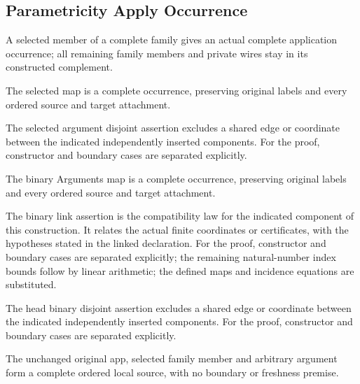 \subsection{Parametricity Apply Occurrence}
A selected member of a complete family gives an actual complete application occurrence; all remaining family members and private wires stay in its constructed complement.

The selected map is a complete occurrence, preserving original labels and every ordered source and target attachment.
\par{}

The selected argument disjoint assertion excludes a shared edge or coordinate between the indicated independently inserted components.
For the proof, constructor and boundary cases are separated explicitly.
\par{}

The binary Arguments map is a complete occurrence, preserving original labels and every ordered source and target attachment.
\par{}

The binary link assertion is the compatibility law for the indicated component of this construction. It relates the actual finite coordinates or certificates, with the hypotheses stated in the linked declaration.
For the proof, constructor and boundary cases are separated explicitly; the remaining natural-number index bounds follow by linear arithmetic; the defined maps and incidence equations are substituted.
\par{}

The head binary disjoint assertion excludes a shared edge or coordinate between the indicated independently inserted components.
For the proof, constructor and boundary cases are separated explicitly.
\par{}

The unchanged original app, selected family member and arbitrary argument form a complete ordered local source, with no boundary or freshness premise.
\par{}


